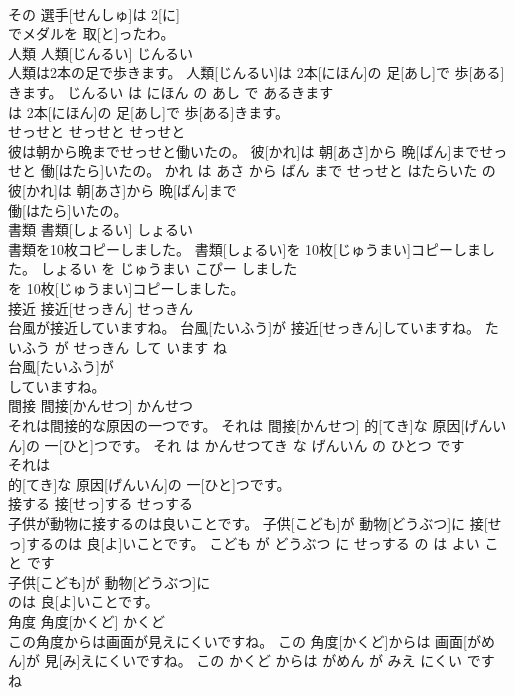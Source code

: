 \documentclass[8pt]{extreport}
\begin{document}
\begin{CJK}{UTF8}{min}
\\	その 選手[せんしゅ]は 2[に]
\\	でメダルを 取[と]ったわ。			
\\	人類	人類[じんるい]	じんるい	
\\	人類は2本の足で歩きます。	人類[じんるい]は 2本[にほん]の 足[あし]で 歩[ある]きます。	じんるい は にほん の あし で あるきます	
\\	は 2本[にほん]の 足[あし]で 歩[ある]きます。			
\\	せっせと	せっせと	せっせと	
\\	彼は朝から晩までせっせと働いたの。	彼[かれ]は 朝[あさ]から 晩[ばん]までせっせと 働[はたら]いたの。	かれ は あさ から ばん まで せっせと はたらいた の	
\\	彼[かれ]は 朝[あさ]から 晩[ばん]まで
\\	働[はたら]いたの。			
\\	書類	書類[しょるい]	しょるい	
\\	書類を10枚コピーしました。	書類[しょるい]を 10枚[じゅうまい]コピーしました。	しょるい を じゅうまい こぴー しました	
\\	を 10枚[じゅうまい]コピーしました。			
\\	接近	接近[せっきん]	せっきん	
\\	台風が接近していますね。	台風[たいふう]が 接近[せっきん]していますね。	たいふう が せっきん して います ね	
\\	台風[たいふう]が
\\	していますね。			
\\	間接	間接[かんせつ]	かんせつ	
\\	それは間接的な原因の一つです。	それは 間接[かんせつ] 的[てき]な 原因[げんいん]の 一[ひと]つです。	それ は かんせつてき な げんいん の ひとつ です	
\\	それは
\\	的[てき]な 原因[げんいん]の 一[ひと]つです。			
\\	接する	接[せっ]する	せっする	
\\	子供が動物に接するのは良いことです。	子供[こども]が 動物[どうぶつ]に 接[せっ]するのは 良[よ]いことです。	こども が どうぶつ に せっする の は よい こと です	
\\	子供[こども]が 動物[どうぶつ]に
\\	のは 良[よ]いことです。			
\\	角度	角度[かくど]	かくど	
\\	この角度からは画面が見えにくいですね。	この 角度[かくど]からは 画面[がめん]が 見[み]えにくいですね。	この かくど からは がめん が みえ にくい です ね	

\end{CJK}
\end{document}
